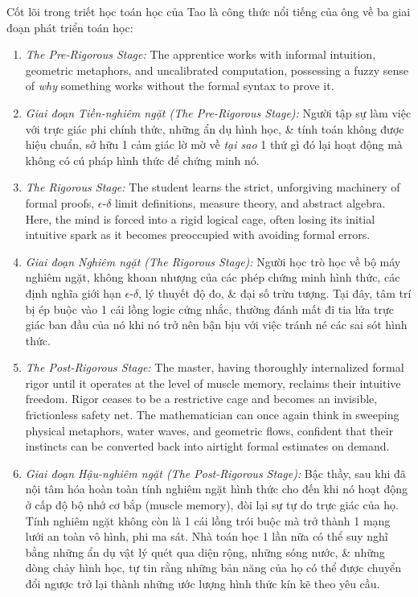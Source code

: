 \documentclass[11pt]{article}
\begin{document}
Cốt lõi trong triết học toán học của Tao là công thức nổi tiếng của ông về ba giai đoạn phát triển toán học:

\begin{enumerate}
    \item \emph{The Pre-Rigorous Stage:} The apprentice works with informal intuition, geometric metaphors, and uncalibrated computation, possessing a fuzzy sense of \textit{why} something works without the formal syntax to prove it.

\item \emph{Giai đoạn Tiền-nghiêm ngặt (The Pre-Rigorous Stage):} Người tập sự làm việc với trực giác phi chính thức, những ẩn dụ hình học, \& tính toán không được hiệu chuẩn, sở hữu 1 cảm giác lờ mờ về \textit{tại sao} 1 thứ gì đó lại hoạt động mà không có cú pháp hình thức để chứng minh nó.

\item \emph{The Rigorous Stage:} The student learns the strict, unforgiving machinery of formal proofs, $\epsilon$-$\delta$ limit definitions, measure theory, and abstract algebra. Here, the mind is forced into a rigid logical cage, often losing its initial intuitive spark as it becomes preoccupied with avoiding formal errors.

\item \emph{Giai đoạn Nghiêm ngặt (The Rigorous Stage):} Người học trò học về bộ máy nghiêm ngặt, không khoan nhượng của các phép chứng minh hình thức, các định nghĩa giới hạn $\epsilon$-$\delta$, lý thuyết độ đo, \& đại số trừu tượng. Tại đây, tâm trí bị ép buộc vào 1 cái lồng logic cứng nhắc, thường đánh mất đi tia lửa trực giác ban đầu của nó khi nó trở nên bận bịu với việc tránh né các sai sót hình thức.

\item \emph{The Post-Rigorous Stage:} The master, having thoroughly internalized formal rigor until it operates at the level of muscle memory, reclaims their intuitive freedom. Rigor ceases to be a restrictive cage and becomes an invisible, frictionless safety net. The mathematician can once again think in sweeping physical metaphors, water waves, and geometric flows, confident that their instincts can be converted back into airtight formal estimates on demand.

\item \emph{Giai đoạn Hậu-nghiêm ngặt (The Post-Rigorous Stage):} Bậc thầy, sau khi đã nội tâm hóa hoàn toàn tính nghiêm ngặt hình thức cho đến khi nó hoạt động ở cấp độ bộ nhớ cơ bắp (muscle memory), đòi lại sự tự do trực giác của họ. Tính nghiêm ngặt không còn là 1 cái lồng trói buộc mà trở thành 1 mạng lưới an toàn vô hình, phi ma sát. Nhà toán học 1 lần nữa có thể suy nghĩ bằng những ẩn dụ vật lý quét qua diện rộng, những sóng nước, \& những dòng chảy hình học, tự tin rằng những bản năng của họ có thể được chuyển đổi ngược trở lại thành những ước lượng hình thức kín kẽ theo yêu cầu.
\end{enumerate}
\end{document}
